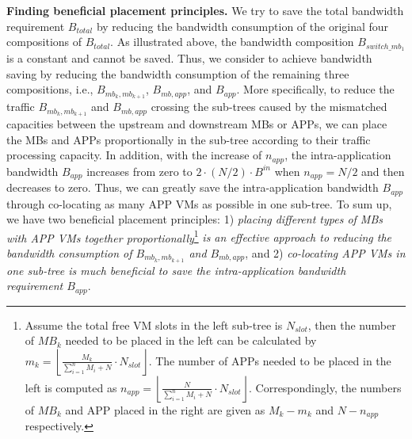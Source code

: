 \documentclass[review]{elsarticle}
\begin{document}


\textbf{Finding beneficial placement principles.} We try to save the total bandwidth requirement $B_{total}$ by reducing the bandwidth consumption of the original four compositions of $B_{total}$. As illustrated above, the bandwidth composition $B_{switch\_mb_1}$ is a constant and cannot be saved.
Thus, we consider to achieve bandwidth saving by reducing the bandwidth consumption of the remaining three compositions, i.e., $B_{mb_k,mb_{k+1}}$, $B_{mb,app}$, and $B_{app}$. %
More specifically, to reduce the traffic $B_{mb_k,mb_{k+1}}$ and $B_{mb,app}$ crossing the sub-trees caused by the mismatched capacities between the upstream and downstream MBs or APPs, we can place the MBs and APPs proportionally in the sub-tree according to their traffic processing capacity. In addition, %
with the increase of $n_{app}$, the intra-application bandwidth $B_{app}$ increases from zero to $2\cdot (N/2)\cdot B^{in}$ when $n_{app} = N/2$ and then decreases to zero. Thus, we can greatly save the intra-application bandwidth $B_{app}$ through co-locating as many APP VMs as possible in one sub-tree. To sum up, we have two beneficial placement principles: 1) \emph{placing different types of MBs with APP VMs together proportionally}\footnote{Assume the total free VM slots in the left sub-tree is $N_{slot}$, then the number of $MB_k$ needed to be 
	placed in the left can be calculated by $m_k=\left\lfloor\frac{M_k}{\sum\nolimits_{i=1}^{n}M_i+N}\cdot N_{slot}\right\rfloor$. The number of APPs needed to be placed in the left is computed as $n_{app}=\left\lfloor\frac{N}{\sum\nolimits_{i=1}^{n}M_i+N}\cdot N_{slot}\right\rfloor$. Correspondingly, the numbers of $MB_k$ and APP placed in the right are given as $M_k-m_k$ and $N-n_{app}$ respectively.} \emph{is an effective approach to reducing the bandwidth consumption of $B_{mb_k,mb_{k+1}}$ and $B_{mb,app}$}, and 2) \emph{co-locating APP VMs in one sub-tree is much beneficial to save the intra-application bandwidth requirement $B_{app}$}. 
\end{document}

